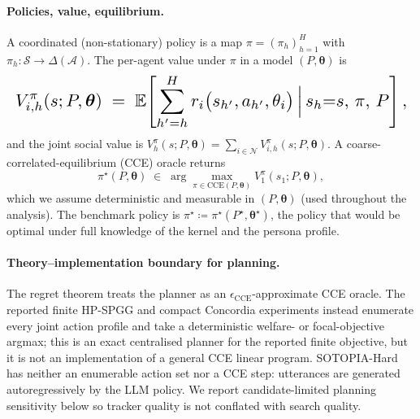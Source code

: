 \documentclass{article}
\begin{document}
\paragraph{Policies, value, equilibrium.} A coordinated (non-stationary) policy is a map $\pi=(\pi_h)_{h=1}^H$ with $\pi_h\!:\mathcal S\!\to\!\Delta(\mathcal A)$. The per-agent value under $\pi$ in a model $(P,\boldsymbol\theta)$ is
\begin{equation*}
\resizebox{\linewidth}{!}{$\displaystyle
V^{\pi}_{i,h}(s;P,\boldsymbol\theta)\;=\;\mathbb E\!\left[\sum_{h'=h}^{H}r_i\big(s_{h'},a_{h'},\theta_i\big)\,\Big|\,s_h{=}s,\,\pi,\,P\right],
$}
\end{equation*}
and the joint social value is $V^{\pi}_h(s;P,\boldsymbol\theta)=\sum_{i\in\mathcal N}V^{\pi}_{i,h}(s;P,\boldsymbol\theta)$. A coarse-correlated-equilibrium (CCE) oracle returns
\begin{equation*}
\pi^\star(P,\boldsymbol\theta)\;\in\;\arg\max_{\pi\in\mathrm{CCE}(P,\boldsymbol\theta)}V^{\pi}_1(s_1;P,\boldsymbol\theta),
\end{equation*}
which we assume deterministic and measurable in $(P,\boldsymbol\theta)$ (used throughout the analysis). The benchmark policy is $\pi^\star\!\coloneqq\!\pi^\star(P^\star,\boldsymbol\theta^\star)$, the policy that would be optimal under full knowledge of the kernel and the persona profile.

\paragraph{Theory--implementation boundary for planning.} The regret theorem treats the planner as an $\epsilon_{\mathrm{CCE}}$-approximate CCE oracle. The reported finite HP-SPGG and compact Concordia experiments instead enumerate every joint action profile and take a deterministic welfare- or focal-objective argmax; this is an exact centralised planner for the reported finite objective, but it is not an implementation of a general CCE linear program. SOTOPIA-Hard has neither an enumerable action set nor a CCE step: utterances are generated autoregressively by the LLM policy. We report candidate-limited planning sensitivity below so tracker quality is not conflated with search quality.
\end{document}
